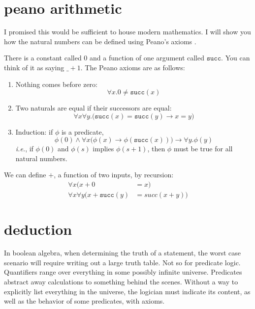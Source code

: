 \documentclass{scrbook}
\renewcommand{\implies}{\to}
\newcommand{\ie}{\emph{i.e.}\xspace}
\begin{document}
\section[Peano Arithmetic]{peano arithmetic}
I promised this would be sufficient to house modern mathematics. I will show you how the natural numbers can be defined using Peano's axioms \cite{wiki:peano}. 

\renewcommand{\succ}{\texttt{succ}}
\begin{defn}
  There is a constant called $0$ and a function of one argument called
  $\succ$. You can think of it as saying $\_+1$.  The Peano axioms are as follows:
  \begin{enumerate}
  \item Nothing comes before zero:
    \[
    \label{peano:0}
    \forall x. 0 \neq \succ(x)
    \]
  \item Two naturals are equal if their successors are equal:
    \[
    \label{peano:succ}
    \forall x\forall y.\bigl( \succ (x) = \succ(y) \implies x=y\bigr)
    \]
  \item Induction: if $\phi$ is a predicate,
    \[
    \label{peano:ind}
    \phi(0) \wedge \forall x \bigl(\phi(x)\implies
    \phi(\succ(x))\bigr) \implies \forall y.\phi(y)
    \]
    \ie, if $\phi(0)$ and $\phi(s)$ implies $\phi(s+1)$, then
    $\phi$ must be true for all natural numbers.
  \end{enumerate}
\end{defn}

\begin{defn}[plus]
  \label{defn:peano:+}
  We can define $+$, a function of two inputs, by recursion:
  \begin{align*}
    \forall x (x + 0 &= x) \\
    \forall x \forall y \bigl(x + \succ(y) &= succ(x+y)\bigr)
  \end{align*}
\end{defn}
\section[Deduction]{deduction}
In boolean algebra, when determining the truth of a statement, the worst case scenario will require writing out a large truth table. Not so for predicate logic. Quantifiers range over everything in some possibly infinite universe. Predicates abstract away calculations to something behind the scenes. Without a way to explicitly list everything in the universe, the logician must indicate its content, as well as the behavior of some predicates, with axioms.  
\end{document}
